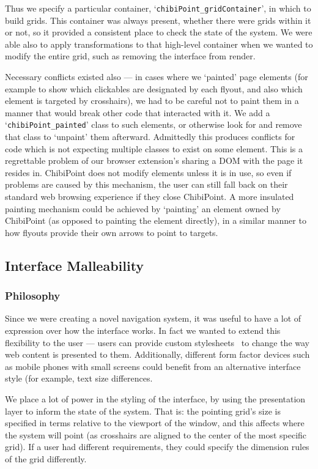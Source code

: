 \documentclass[11pt,openright,a4paper]{report}
\begin{document}
Thus we specify a particular container, `\texttt{chibiPoint\_gridContainer}', in which to build grids. This container was always present, whether there were grids within it or not, so it provided a consistent place to check the state of the system. We were able also to apply transformations to that high-level container when we wanted to modify the entire grid, such as removing the interface from render.

Necessary conflicts existed also --- in cases where we `painted' page elements (for example to show which clickables are designated by each flyout, and also which element is targeted by crosshairs), we had to be careful not to paint them in a manner that would break other code that interacted with it. We add a `\texttt{chibiPoint\_painted}' class to such elements, or otherwise look for and remove that class to `unpaint' them afterward. Admittedly this produces conflicts for code which is not expecting multiple classes to exist on some element. This is a regrettable problem of our browser extension's sharing a DOM with the page it resides in. ChibiPoint does not modify elements unless it is in use, so even if problems are caused by this mechanism, the user can still fall back on their standard web browsing experience if they close ChibiPoint. A more insulated painting mechanism could be achieved by `painting' an element owned by ChibiPoint (as opposed to painting the element directly), in a similar manner to how flyouts provide their own arrows to point to targets.

\subsection{Interface Malleability}
\subsubsection{Philosophy}
Since we were creating a novel navigation system, it was useful to have a lot of expression over how the interface works. In fact we wanted to extend this flexibility to the user --- users can provide custom stylesheets~\cite{stylebot} to change the way web content is presented to them. Additionally, different form factor devices such as mobile phones with small screens could benefit from an alternative interface style (for example, text size differences.

We place a lot of power in the styling of the interface, by using the presentation layer to inform the state of the system. That is: the pointing grid's size is specified in terms relative to the viewport of the window, and this affects where the system will point (as crosshairs are aligned to the center of the most specific grid). If a user had different requirements, they could specify the dimension rules of the grid differently.
\end{document}
